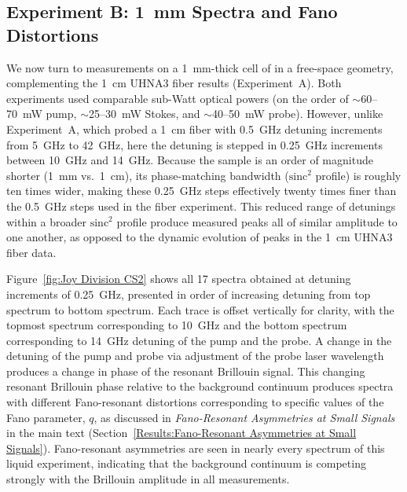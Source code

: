 \FloatBarrier

\subsection{Experiment B: \SI{1}{\milli\meter} \texorpdfstring{}{CS2} Spectra and Fano Distortions}
\label{Appendix:Fano:Experiment B}

We now turn to measurements on a \SI{1}{\milli\meter}-thick cell of  in a free-space geometry, complementing the \SI{1}{\centi\meter} UHNA3 fiber results (Experiment~A). Both experiments used comparable sub-Watt optical powers (on the order of \(\sim\)60–\SI{70}{\milli\watt} pump, \(\sim\)25–\SI{30}{\milli\watt} Stokes, and \(\sim\)40–\SI{50}{\milli\watt} probe). However, unlike Experiment~A, which probed a \SI{1}{\centi\meter} fiber with \SI{0.5}{\giga\hertz} detuning increments from \SI{5}{\giga\hertz} to \SI{42}{\giga\hertz}, here the detuning is stepped in \SI{0.25}{\giga\hertz} increments between \SI{10}{\giga\hertz} and \SI{14}{\giga\hertz}. Because the  sample is an order of magnitude shorter (\SI{1}{\milli\meter} vs.\ \SI{1}{\centi\meter}), its phase-matching bandwidth (\(\mathrm{sinc}^{2}\) profile) is roughly ten times wider, making these \SI{0.25}{\giga\hertz} steps effectively twenty times finer than the \SI{0.5}{\giga\hertz} steps used in the fiber experiment. This reduced range of detunings within a broader \(\mathrm{sinc^2}\) profile produce measured peaks all of similar amplitude to one another, as opposed to the dynamic evolution of peaks in the \SI{1}{\centi\meter} UHNA3 fiber data.

Figure~\ref{fig:Joy Division CS2} shows all 17 spectra obtained at detuning increments of \SI{0.25}{\giga\hertz}, presented in order of increasing detuning from top spectrum to bottom spectrum. Each trace is offset vertically for clarity, with the topmost spectrum corresponding to \SI{10}{\giga\hertz} and the bottom spectrum corresponding to \SI{14}{\giga\hertz} detuning of the pump and the probe. A change in the detuning of the pump and probe via adjustment of the probe laser wavelength produces a change in phase of the resonant Brillouin signal. This changing resonant Brillouin phase relative to the background continuum produces spectra with different Fano-resonant distortions corresponding to specific values of the Fano parameter, \(q\), as discussed in \textit{Fano-Resonant Asymmetries at Small Signals} in the main text (Section~\ref{Results:Fano-Resonant Asymmetries at Small Signals}). Fano-resonant asymmetries are seen in nearly every spectrum of this liquid experiment, indicating that the background continuum is competing strongly with the Brillouin amplitude in all measurements.

